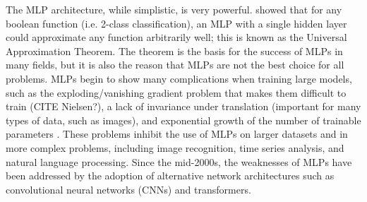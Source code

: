 The MLP architecture, while simplistic, is very powerful. \textcite{cybenko1989} showed that for any boolean 
function (i.e. 2-class classification), an MLP with a single hidden layer could 
approximate any function arbitrarily well; this is known as the Universal Approximation
Theorem. The theorem is the basis for the success of MLPs in
many fields, but it is also the reason that MLPs are not the best choice for all problems.
MLPs begin to show many complications when training large models, such as the 
exploding/vanishing gradient problem that makes them difficult to train (CITE Nielsen?), a lack of invariance under translation (important for many types of data, such as images), 
and exponential growth of the number of trainable parameters \parencite{Naskath2022}. These problems inhibit the use of MLPs on larger datasets and in more complex problems, including 
image recognition, time series analysis, and natural language processing. Since 
the mid-2000s, the weaknesses of MLPs have been addressed by the adoption of 
alternative network architectures such as convolutional neural networks (CNNs) and
transformers.

